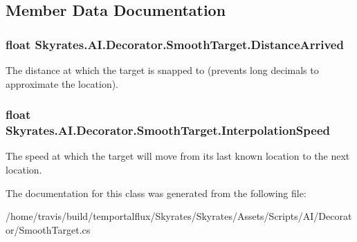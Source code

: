 \subsection{Member Data Documentation}
\hypertarget{class_skyrates_1_1_a_i_1_1_decorator_1_1_smooth_target_a48d78b71d13d4bdbb8ed967d30e26242}{
\subsubsection[{Distance\-Arrived}]{\setlength{\rightskip}{0pt plus 5cm}float Skyrates.\-A\-I.\-Decorator.\-Smooth\-Target.\-Distance\-Arrived}}\label{class_skyrates_1_1_a_i_1_1_decorator_1_1_smooth_target_a48d78b71d13d4bdbb8ed967d30e26242}


The distance at which the target is snapped to (prevents long decimals to approximate the location). 

\hypertarget{class_skyrates_1_1_a_i_1_1_decorator_1_1_smooth_target_a4d83be120553c3b0d42b6cf78d28386d}{
\subsubsection[{Interpolation\-Speed}]{\setlength{\rightskip}{0pt plus 5cm}float Skyrates.\-A\-I.\-Decorator.\-Smooth\-Target.\-Interpolation\-Speed}}\label{class_skyrates_1_1_a_i_1_1_decorator_1_1_smooth_target_a4d83be120553c3b0d42b6cf78d28386d}


The speed at which the target will move from its last known location to the next location. 



The documentation for this class was generated from the following file\-:\begin{DoxyCompactItemize}
\item 
/home/travis/build/temportalflux/\-Skyrates/\-Skyrates/\-Assets/\-Scripts/\-A\-I/\-Decorator/Smooth\-Target.\-cs\end{DoxyCompactItemize}
